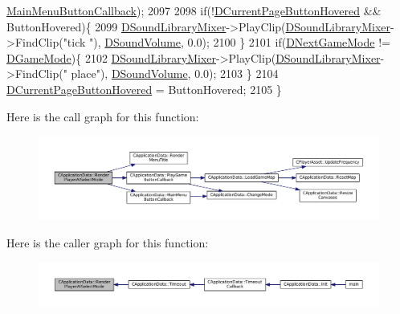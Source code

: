 \begin{DoxyCode}
      \hyperlink{classCApplicationData_a4410839118b5b74dab798ad7be6f703b}{MainMenuButtonCallback});
2097     
2098     \textcolor{keywordflow}{if}(!\hyperlink{classCApplicationData_a96b3a9b5c9965540007dff3fa85587fa}{DCurrentPageButtonHovered} && ButtonHovered)\{
2099         \hyperlink{classCApplicationData_aa1e6876121bb4fb229ec6b930a8a6766}{DSoundLibraryMixer}->PlayClip(\hyperlink{classCApplicationData_aa1e6876121bb4fb229ec6b930a8a6766}{DSoundLibraryMixer}->FindClip(\textcolor{stringliteral}{"tick
      "}), \hyperlink{classCApplicationData_aa6e540f860dcb1929ef36ddce3be3691}{DSoundVolume}, 0.0);
2100     \}
2101     \textcolor{keywordflow}{if}(\hyperlink{classCApplicationData_a3b67edeacd70201dcf96fa9fa8aa2107}{DNextGameMode} != \hyperlink{classCApplicationData_a2f906f2b4208ecb2a057e6b62e549685}{DGameMode})\{
2102         \hyperlink{classCApplicationData_aa1e6876121bb4fb229ec6b930a8a6766}{DSoundLibraryMixer}->PlayClip(\hyperlink{classCApplicationData_aa1e6876121bb4fb229ec6b930a8a6766}{DSoundLibraryMixer}->FindClip(\textcolor{stringliteral}{"
      place"}), \hyperlink{classCApplicationData_aa6e540f860dcb1929ef36ddce3be3691}{DSoundVolume}, 0.0);
2103     \}
2104     \hyperlink{classCApplicationData_a96b3a9b5c9965540007dff3fa85587fa}{DCurrentPageButtonHovered} = ButtonHovered;
2105 \}
\end{DoxyCode}
Here is the call graph for this function\+:
\nopagebreak
\begin{figure}[H]
\begin{center}
\leavevmode
\includegraphics[width=350pt]{classCApplicationData_a7d46646402ac95a056456e4a3bb353ed_cgraph}
\end{center}
\end{figure}
Here is the caller graph for this function\+:
\nopagebreak
\begin{figure}[H]
\begin{center}
\leavevmode
\includegraphics[width=350pt]{classCApplicationData_a7d46646402ac95a056456e4a3bb353ed_icgraph}
\end{center}
\end{figure}
\hypertarget{classCApplicationData_a18ae4aed31d9ef2416059e66babb05b0}{}\label{classCApplicationData_a18ae4aed31d9ef2416059e66babb05b0} 
